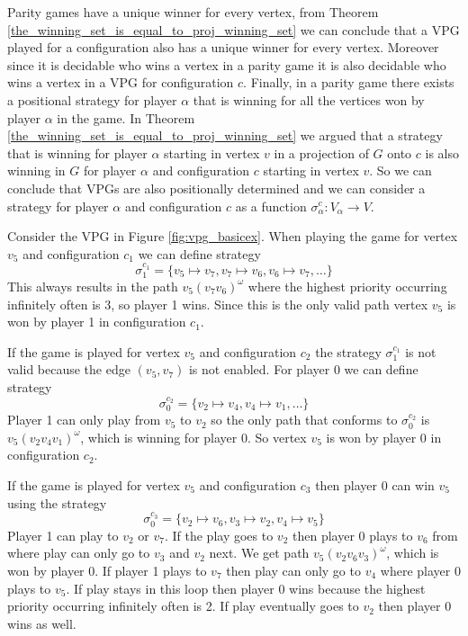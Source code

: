 Parity games have a unique winner for every vertex, from Theorem \ref{the_winning_set_is_equal_to_proj_winning_set} we can conclude that a VPG played for a configuration also has a unique winner for every vertex. Moreover since it is decidable who wins a vertex in a parity game it is also decidable who wins a vertex in a VPG for configuration $c$. Finally, in a parity game there exists a positional strategy for player $\alpha$ that is winning for all the vertices won by player $\alpha$ in the game. In Theorem \ref{the_winning_set_is_equal_to_proj_winning_set} we argued that a strategy that is winning for player $\alpha$ starting in vertex $v$ in a projection of $G$ onto $c$ is also winning in $G$ for player $\alpha$ and configuration $c$ starting in vertex $v$. So we can conclude that VPGs are also positionally determined and we can consider a strategy for player $\alpha$ and configuration $c$ as a function $\sigma_\alpha^c : V_\alpha \rightarrow V$.

\begin{example}
	Consider the VPG in Figure \ref{fig:vpg_basicex}. When playing the game for vertex $v_5$ and configuration $c_1$ we can define strategy 
	\[ \sigma_1^{c_1} = \{ v_5 \mapsto v_7, v_7\mapsto v_6,v_6\mapsto v_7, \dots \}\]
	This always results in the path $v_5(v_7v_6)^\omega$ where the highest priority occurring infinitely often is 3, so player 1 wins. Since this is the only valid path vertex $v_5$ is won by player 1 in configuration $c_1$.
	
	If the game is played for vertex $v_5$ and configuration $c_2$ the strategy $\sigma_1^{c_1}$ is not valid because the edge $(v_5,v_7)$ is not enabled. For player $0$ we can define strategy
	\[ \sigma_0^{c_2} = \{ v_2 \mapsto v_4, v_4 \mapsto v_1,\dots\}\]
	Player 1 can only play from $v_5$ to $v_2$ so the only path that conforms to $\sigma_0^{c_2}$ is $v_5(v_2v_4v_1)^\omega$, which is winning for player 0. So vertex $v_5$ is won by player 0 in configuration $c_2$.
	
	If the game is played for vertex $v_5$ and configuration $c_3$ then player $0$ can win $v_5$ using the strategy
	\[ \sigma_0^{c_3} = \{ v_2 \mapsto v_6, v_3 \mapsto v_2, v_4 \mapsto v_5 \}\]
	Player 1 can play to $v_2$ or $v_7$. If the play goes to $v_2$ then player 0 plays to $v_6$ from where play can only go to $v_3$ and $v_2$ next. We get path $v_5(v_2v_6v_3)^\omega$, which is won by player 0. If player 1 plays to $v_7$ then play can only go to $v_4$ where player 0 plays to $v_5$. If play stays in this loop then player 0 wins because the highest priority occurring infinitely often is 2. If play eventually goes to $v_2$ then player 0 wins as well.
\end{example}

